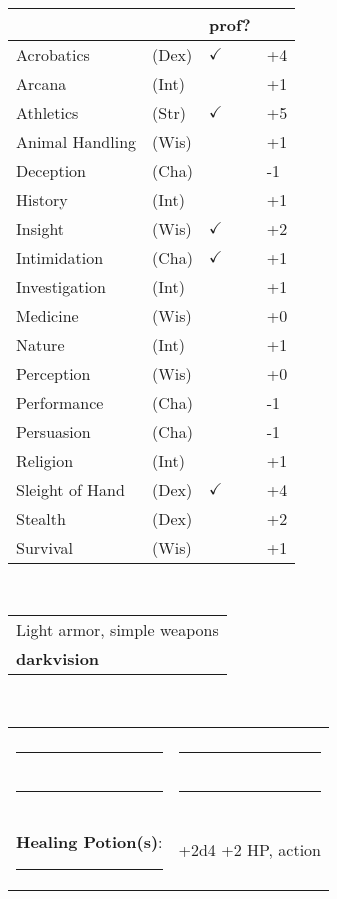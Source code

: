 \documentclass[twocolumn]{article}
\begin{document}
\\
\noindent\begin{tabular}{llll}
 & & prof? & \\
\hline
Acrobatics & (Dex) & $\checkmark$ &+4 \\
Arcana & (Int) &  & +1 \\ 
Athletics & (Str) & $\checkmark$ & +5\\
Animal Handling & (Wis) &  & +1\\
Deception & (Cha) &  & -1\\
History & (Int) &  & +1 \\
Insight & (Wis) & $\checkmark$ & +2 \\
Intimidation & (Cha) & $\checkmark$ & +1 \\
Investigation & (Int) &  & +1 \\
Medicine & (Wis) &  & +0 \\
Nature & (Int) &  & +1 \\
Perception & (Wis) &  & +0 \\
Performance & (Cha) &  & -1 \\
Persuasion & (Cha) &  & -1 \\
Religion & (Int) &  & +1 \\
Sleight of Hand & (Dex) & $\checkmark$ & +4 \\
Stealth & (Dex) &  & +2 \\
Survival & (Wis) &  & +1 \\
\hline
\end{tabular}
\vspace{12pt}

\\
\noindent\begin{tabular}{|m{3.1in}|}
\hline
Light armor, simple weapons \\
\textbf{darkvision} \\
\hline
\end{tabular}
\vspace{12pt}


\\
\noindent\begin{tabular}{|ll|}
\hline&\\
\rule{1.4in}{.2pt}&\rule{1.4in}{.2pt}\\
\rule{1.4in}{.2pt}&\rule{1.4in}{.2pt}\\
\textbf{Healing Potion(s)}: \rule{.2in}{.2pt}& +2d4 +2 HP, {\sc action}\\
\hline
\end{tabular}
\vspace{12pt}
\end{document}
